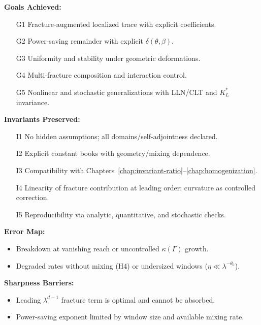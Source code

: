 \begin{auditblock}
\textbf{Goals Achieved:}
\begin{itemize}
  \item[G1] Fracture-augmented localized trace with explicit coefficients.
  \item[G2] Power-saving remainder with explicit $\delta(\theta,\beta)$.
  \item[G3] Uniformity and stability under geometric deformations.
  \item[G4] Multi-fracture composition and interaction control.
  \item[G5] Nonlinear and stochastic generalizations with LLN/CLT and $K_L^*$ invariance.
\end{itemize}

\textbf{Invariants Preserved:}
\begin{itemize}
  \item[I1] No hidden assumptions; all domains/self-adjointness declared.
  \item[I2] Explicit constant books with geometry/mixing dependence.
  \item[I3] Compatibility with Chapters~\ref{chap:invariant-ratio}–\ref{chap:homogenization}.
  \item[I4] Linearity of fracture contribution at leading order; curvature as controlled correction.
  \item[I5] Reproducibility via analytic, quantitative, and stochastic checks.
\end{itemize}

\textbf{Error Map:}
\begin{itemize}
  \item Breakdown at vanishing reach or uncontrolled $\kappa(\Gamma)$ growth.
  \item Degraded rates without mixing (H4) or undersized windows ($\eta\ll \lambda^{-\theta_0}$).
\end{itemize}

\textbf{Sharpness Barriers:}
\begin{itemize}
  \item Leading $\lambda^{d-1}$ fracture term is optimal and cannot be absorbed.
  \item Power-saving exponent limited by window size and available mixing rate.
\end{itemize}
\end{auditblock}

